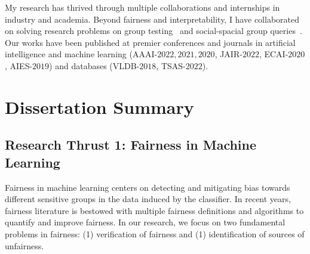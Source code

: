\documentclass{article}
\begin{document}
	
	My research has thrived through multiple collaborations and internships in industry and academia. Beyond fairness and interpretability, I have collaborated on solving research problems on  group testing~\cite{ciampiconi2020maxsat} and social-spacial group queries~\cite{ghosh2018flexible,apon2021social}. Our works have been published at premier conferences and journals in artificial intelligence and machine learning (AAAI-$ 2022, 2021, 2020 $, JAIR-$ 2022 $, ECAI-$ 2020 $, AIES-$ 2019 $) and databases (VLDB-$ 2018 $, TSAS-$ 2022 $).
	
	
	
	
	
	\section*{Dissertation Summary}
	
	\subsection*{Research Thrust 1: Fairness in Machine Learning}
	
	Fairness in machine learning centers on detecting and mitigating bias towards different sensitive groups in the data induced by the classifier. In recent years, fairness literature is bestowed with multiple fairness definitions and algorithms to quantify and improve fairness. In our research, we focus on two fundamental problems in fairness: (1) verification of fairness and (1) identification of sources of unfairness. 
	
	
\end{document}
